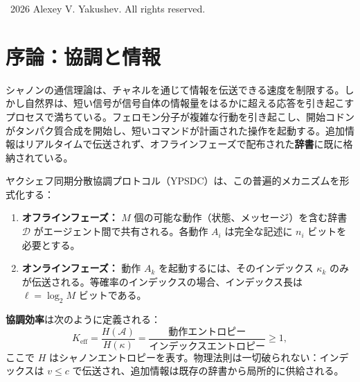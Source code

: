 \documentclass[12pt,a4paper]{article}
\begin{document}
		\vspace{1cm}
		\textcopyright\ 2026 Alexey V. Yakushev. All rights reserved.
	
	
	\tableofcontents
	\newpage
	
	\section{序論：協調と情報}
	\label{sec:intro}
	
	シャノンの通信理論は、チャネルを通じて情報を伝送できる速度を制限する。しかし自然界は、短い信号が信号自体の情報量をはるかに超える応答を引き起こすプロセスで満ちている。フェロモン分子が複雑な行動を引き起こし、開始コドンがタンパク質合成を開始し、短いコマンドが計画された操作を起動する。追加情報はリアルタイムで伝送されず、オフラインフェーズで配布された\textbf{辞書}に既に格納されている。
	
	ヤクシェフ同期分散協調プロトコル（YPSDC）は、この普遍的メカニズムを形式化する：
	\begin{enumerate}[label=(\roman*)]
		\item \textbf{オフラインフェーズ：} \(M\) 個の可能な動作（状態、メッセージ）を含む辞書 \(\mathcal{D}\) がエージェント間で共有される。各動作 \(A_i\) は完全な記述に \(n_i\) ビットを必要とする。
		\item \textbf{オンラインフェーズ：} 動作 \(A_k\) を起動するには、そのインデックス \(\kappa_k\) のみが伝送される。等確率のインデックスの場合、インデックス長は \(\ell = \log_2 M\) ビットである。
	\end{enumerate}
	\textbf{協調効率}は次のように定義される：
	\begin{equation}
		\boxed{K_{\mathrm{eff}} = \frac{H(\mathcal{A})}{H(\kappa)} = \frac{\text{動作エントロピー}}{\text{インデックスエントロピー}} \ge 1},
		\label{eq:keff-def}
	\end{equation}
	ここで \(H\) はシャノンエントロピーを表す。物理法則は一切破られない：インデックスは \(v \le c\) で伝送され、追加情報は既存の辞書から局所的に供給される。
	
	\begin{center}
	\end{center}
	
\end{document}
